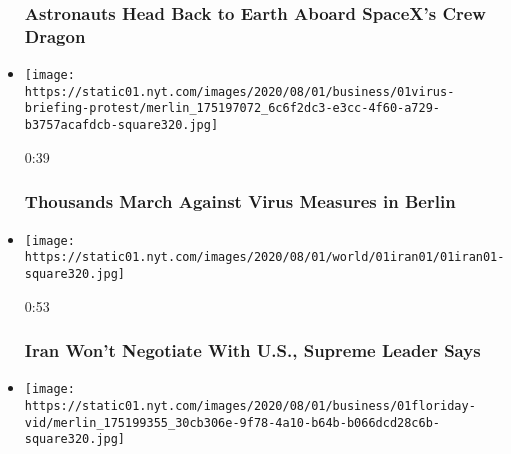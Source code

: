 \begin{itemize}
  \hypertarget{astronauts-head-back-to-earth-aboard-spacexs-crew-dragon}{%
  \subsubsection{Astronauts Head Back to Earth Aboard SpaceX's Crew
  Dragon}\label{astronauts-head-back-to-earth-aboard-spacexs-crew-dragon}}
\item
  \href{https://www.nytimes.com/video/world/europe/100000007268465/coronavirus-protest-germany.html?action=click\&module=video-series-bar\&region=header\&pgtype=Article\&playlistId=video/latest-video}{}

  \texttt{[image: https://static01.nyt.com/images/2020/08/01/business/01virus-briefing-protest/merlin\_175197072\_6c6f2dc3-e3cc-4f60-a729-b3757acafdcb-square320.jpg]}

  0:39

  \hypertarget{thousands-march-against-virus-measures-in-berlin}{%
  \subsubsection{Thousands March Against Virus Measures in
  Berlin}\label{thousands-march-against-virus-measures-in-berlin}}
\item
  \href{https://www.nytimes.com/video/world/middleeast/100000007268443/iran-united-states-nuclear-program-negotiation.html?action=click\&module=video-series-bar\&region=header\&pgtype=Article\&playlistId=video/latest-video}{}

  \texttt{[image: https://static01.nyt.com/images/2020/08/01/world/01iran01/01iran01-square320.jpg]}

  0:53

  \hypertarget{iran-wont-negotiate-with-us-supreme-leader-says}{%
  \subsubsection{Iran Won't Negotiate With U.S., Supreme Leader
  Says}\label{iran-wont-negotiate-with-us-supreme-leader-says}}
\item
  \href{https://www.nytimes.com/video/us/100000007268424/desantis-florida-hurricane-isaias.html?action=click\&module=video-series-bar\&region=header\&pgtype=Article\&playlistId=video/latest-video}{}

  \texttt{[image: https://static01.nyt.com/images/2020/08/01/business/01floriday-vid/merlin\_175199355\_30cb306e-9f78-4a10-b64b-b066dcd28c6b-square320.jpg]}


\end{itemize}
